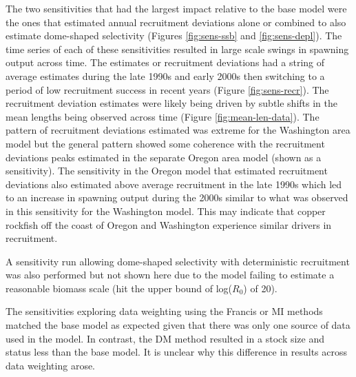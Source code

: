 \documentclass[11pt,
  english,
  a4paper,
]{article}
\begin{document}
The two sensitivities that had the largest impact relative to the base model were the ones that estimated annual recruitment deviations alone or combined to also estimate dome-shaped selectivity (Figures \ref{fig:sens-ssb} and \ref{fig:sens-depl}). The time series of each of these sensitivities resulted in large scale swings in spawning output across time. The estimates or recruitment deviations had a string of average estimates during the late 1990s and early 2000s then switching to a period of low recruitment success in recent years (Figure \ref{fig:sens-recr}). The recruitment deviation estimates were likely being driven by subtle shifts in the mean lengths being observed across time (Figure \ref{fig:mean-len-data}). The pattern of recruitment deviations estimated was extreme for the Washington area model but the general pattern showed some coherence with the recruitment deviations peaks estimated in the separate Oregon area model (shown as a sensitivity). The sensitivity in the Oregon model that estimated recruitment deviations also estimated above average recruitment in the late 1990s which led to an increase in spawning output during the 2000s similar to what was observed in this sensitivity for the Washington model. This may indicate that copper rockfish off the coast of Oregon and Washington experience similar drivers in recruitment.

\leavevmode\tagmcend\tagstructend\par


A sensitivity run allowing dome-shaped selectivity with deterministic recruitment was also performed but not shown here due to the model failing to estimate a reasonable biomass scale (hit the upper bound of log({\(R_0\)\leavevmode\tagmcend\tagstructend}) of 20).

\leavevmode\tagmcend\tagstructend\par


The sensitivities exploring data weighting using the Francis or MI methods matched the base model as expected given that there was only one source of data used in the model. In contrast, the DM method resulted in a stock size and status less than the base model. It is unclear why this difference in results across data weighting arose.

\leavevmode\tagmcend\tagstructend\par
\end{document}

